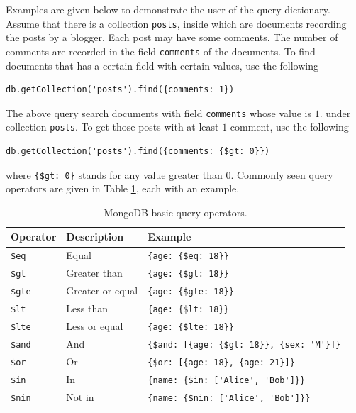 Examples are given below to demonstrate the user of the query dictionary. Assume that there is a collection \verb|posts|, inside which are documents recording the posts by a blogger. Each post may have some comments. The number of comments are recorded in the field \verb|comments| of the documents. To find documents that has a certain field with certain values, use the following
\begin{lstlisting}
db.getCollection('posts').find({comments: 1})
\end{lstlisting}
The above query search documents with field \verb|comments| whose value is $1$. under collection \verb|posts|. To get those posts with at least $1$ comment, use the following
\begin{lstlisting}
db.getCollection('posts').find({comments: {$gt: 0}})
\end{lstlisting}
where \verb|{$gt: 0}| stands for any value greater than $0$. Commonly seen query operators are given in Table \ref{ch:db:tab:mongodbqueryoperator}, each with an example.

\begin{table}[!htb]
	\centering \caption{MongoDB basic query operators.} \label{ch:db:tab:mongodbqueryoperator}
	\begin{tabularx}{\textwidth}{llX}
		\hline
		Operator & Description & Example \\ \hline
		\verb|$eq| & Equal & \verb|{age: {$eq: 18}}| \\ 
		\verb|$gt| & Greater than & \verb|{age: {$gt: 18}}| \\ 
		\verb|$gte| & Greater or equal & \verb|{age: {$gte: 18}}| \\ 
		\verb|$lt| & Less than & \verb|{age: {$lt: 18}}| \\ 
		\verb|$lte| & Less or equal & \verb|{age: {$lte: 18}}| \\ 
		\verb|$and| & And & \verb|{$and: [{age: {$gt: 18}}, {sex: 'M'}]}| \\ 
		\verb|$or| & Or &  \verb|{$or: [{age: 18}, {age: 21}]}| \\ 
		\verb|$in| & In & \verb|{name: {$in: ['Alice', 'Bob']}}| \\ 
		\verb|$nin| & Not in & \verb|{name: {$nin: ['Alice', 'Bob']}}| \\
		\hline
	\end{tabularx}
\end{table}

